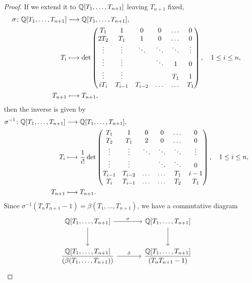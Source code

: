 \documentclass[11pt]{amsart}
\begin{document}
\begin{proof}
    If we extend it to \(\mathbb{Q}[T_1,\dots,T_{n + 1}]\) leaving \(T_{n + 1}\) fixed,
     \begin{align*}
        \sigma \colon \mathbb{Q} [T_1,\dots,T_{n + 1}] &\longrightarrow \mathbb{Q}[T_1,\dots,T_{n + 1}],\\
        T_i &\longmapsto \det\begin{pmatrix}
        T_1 & 1 & 0& 0 & \dots &0\\
        2T_2 & T_1 & 1 & 0& \dots & 0\\
        \vdots & \vdots & \ddots & \ddots &\ddots & \vdots \\
        \vdots &  \vdots &&\ddots & 1 & 0\\
        \vdots & \vdots &&&T_1 & 1\\
        iT_i & T_{i-1} & T_{i-2} &\dots &\dots& T_1\\
    \end{pmatrix}, \quad 1 \leq i \leq n,\\
    T_{n + 1} &\longmapsto T_{n + 1},
    \end{align*}
    then the inverse is given by
    \begin{align*}
        \sigma^{-1} \colon \mathbb{Q} [T_1,\dots,T_{n + 1}] &\longrightarrow \mathbb{Q}[T_1,\dots,T_{n + 1}],\\
        T_i &\longmapsto \frac{1}{i!}\det\begin{pmatrix}
        T_1 & 1 & 0 & 0 & \dots & 0\\
        T_2 & T_1 & 2  & 0 & \dots & 0\\
        \vdots & \vdots & \ddots & \ddots & \ddots & \vdots\\
        \vdots & \vdots &  & \ddots & \ddots & 0 \\
        T_{i-1} & T_{i -2} & \dots & \dots & T_1 & i-1 \\
        T_i & T_{i - 1} & \dots & \dots & T_2 & T_1 \\
    \end{pmatrix}, \quad 1\leq i \leq n, \\
    T_{n + 1} &\longmapsto T_{n + 1}.
    \end{align*}
    Since \(\sigma^{-1} (T_n T_{n + 1} - 1) = \beta (T_1,\dots,T_{n + 1})\), we have a commutative diagram
    \[
    \begin{tikzcd}[row sep=large, column sep=large]
    \mathbb{Q}[T_1, \dots, T_{n+1}] \arrow[r, "\sigma"] \arrow[d] & \mathbb{Q}[T_1, \dots, T_{n+1}] \arrow[d] \\
    \dfrac{\mathbb{Q}[T_1, \dots, T_{n+1}]}{(\beta(T_1, \dots, T_{n+1}))} \arrow[r, "\tilde{\sigma}"] & \dfrac{\mathbb{Q}[T_1, \dots, T_{n+1}]}{(T_n T_{n+1} - 1)}

\end{tikzcd}\]
\end{proof}
\end{document}
